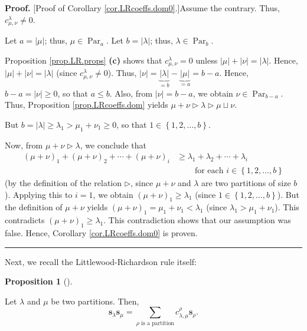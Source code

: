 \documentclass[numbers=enddot,12pt,final,onecolumn,notitlepage]{scrartcl}%
\theoremstyle{definition}
\newtheorem{prop}[theo]{Proposition}
\newenvironment{proposition}[1][]
{\begin{prop}[#1]\begin{leftbar}}
{\end{leftbar}\end{prop}}
\newenvironment{proof}[1][Proof]{\noindent\textbf{#1.} }{\ \rule{0.5em}{0.5em}}
\let\sumnonlimits\sum
\renewcommand{\sum}{\sumnonlimits\limits}
\begin{document}
\begin{proof}
[Proof of Corollary \ref{cor.LRcoeffs.dom0}.]Assume the contrary. Thus,
$c_{\mu,\nu}^{\lambda}\neq0$.

Let $a=\left\vert \mu\right\vert $; thus, $\mu\in\operatorname*{Par}%
\nolimits_{a}$. Let $b=\left\vert \lambda\right\vert $; thus, $\lambda
\in\operatorname*{Par}\nolimits_{b}$.

Proposition \ref{prop.LR.props} \textbf{(c)} shows that $c_{\mu,\nu}^{\lambda
}=0$ unless $\left\vert \mu\right\vert +\left\vert \nu\right\vert =\left\vert
\lambda\right\vert $. Hence, $\left\vert \mu\right\vert +\left\vert
\nu\right\vert =\left\vert \lambda\right\vert $ (since $c_{\mu,\nu}^{\lambda
}\neq0$). Thus, $\left\vert \nu\right\vert =\underbrace{\left\vert
\lambda\right\vert }_{=b}-\underbrace{\left\vert \mu\right\vert }_{=a}=b-a$.
Hence, $b-a=\left\vert \nu\right\vert \geq0$, so that $a\leq b$. Also, from
$\left\vert \nu\right\vert =b-a$, we obtain $\nu\in\operatorname*{Par}%
\nolimits_{b-a}$. Thus, Proposition \ref{prop.LRcoeffs.dom} yields $\mu
+\nu\triangleright\lambda\triangleright\mu\sqcup\nu$.

But $b=\left\vert \lambda\right\vert \geq\lambda_{1}>\mu_{1}+\nu_{1}\geq0$, so
that $1\in\left\{  1,2,\ldots,b\right\}  $.

Now, from $\mu+\nu\triangleright\lambda$, we conclude that%
\begin{align*}
\left(  \mu+\nu\right)  _{1}+\left(  \mu+\nu\right)  _{2}+\cdots+\left(
\mu+\nu\right)  _{i}  &  \geq\lambda_{1}+\lambda_{2}+\cdots+\lambda_{i}\\
&  \ \ \ \ \ \ \ \ \ \ \text{for each }i\in\left\{  1,2,\ldots,b\right\}
\end{align*}
(by the definition of the relation $\triangleright$, since $\mu+\nu$ and
$\lambda$ are two partitions of size $b$). Applying this to $i=1$, we obtain
$\left(  \mu+\nu\right)  _{1}\geq\lambda_{1}$ (since $1\in\left\{
1,2,\ldots,b\right\}  $). But the definition of $\mu+\nu$ yields $\left(
\mu+\nu\right)  _{1}=\mu_{1}+\nu_{1}<\lambda_{1}$ (since $\lambda_{1}>\mu
_{1}+\nu_{1}$). This contradicts $\left(  \mu+\nu\right)  _{1}\geq\lambda_{1}%
$. This contradiction shows that our assumption was false. Hence, Corollary
\ref{cor.LRcoeffs.dom0} is proven.
\end{proof}

Next, we recall the Littlewood-Richardson rule itself:

\begin{proposition}
\label{prop.LRrule}Let $\lambda$ and $\mu$ be two partitions. Then,%
\[
\mathbf{s}_{\lambda}\mathbf{s}_{\mu}=\sum_{\rho\text{ is a partition}%
}c_{\lambda,\mu}^{\rho}\mathbf{s}_{\rho}.
\]

\end{proposition}
\end{document}
